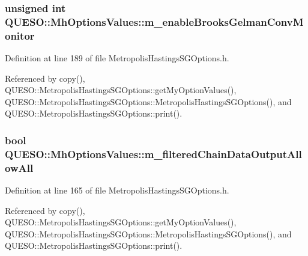 \hypertarget{class_q_u_e_s_o_1_1_mh_options_values_afae1b3bf96ee3657212fa91ac7859bb7}{
\subsubsection[{m\-\_\-enable\-Brooks\-Gelman\-Conv\-Monitor}]{\setlength{\rightskip}{0pt plus 5cm}unsigned int Q\-U\-E\-S\-O\-::\-Mh\-Options\-Values\-::m\-\_\-enable\-Brooks\-Gelman\-Conv\-Monitor}}\label{class_q_u_e_s_o_1_1_mh_options_values_afae1b3bf96ee3657212fa91ac7859bb7}


Definition at line 189 of file Metropolis\-Hastings\-S\-G\-Options.\-h.



Referenced by copy(), Q\-U\-E\-S\-O\-::\-Metropolis\-Hastings\-S\-G\-Options\-::get\-My\-Option\-Values(), Q\-U\-E\-S\-O\-::\-Metropolis\-Hastings\-S\-G\-Options\-::\-Metropolis\-Hastings\-S\-G\-Options(), and Q\-U\-E\-S\-O\-::\-Metropolis\-Hastings\-S\-G\-Options\-::print().

\hypertarget{class_q_u_e_s_o_1_1_mh_options_values_a249e8720b4570d5f4e6504a29a84ac04}{
\subsubsection[{m\-\_\-filtered\-Chain\-Data\-Output\-Allow\-All}]{\setlength{\rightskip}{0pt plus 5cm}bool Q\-U\-E\-S\-O\-::\-Mh\-Options\-Values\-::m\-\_\-filtered\-Chain\-Data\-Output\-Allow\-All}}\label{class_q_u_e_s_o_1_1_mh_options_values_a249e8720b4570d5f4e6504a29a84ac04}


Definition at line 165 of file Metropolis\-Hastings\-S\-G\-Options.\-h.



Referenced by copy(), Q\-U\-E\-S\-O\-::\-Metropolis\-Hastings\-S\-G\-Options\-::get\-My\-Option\-Values(), Q\-U\-E\-S\-O\-::\-Metropolis\-Hastings\-S\-G\-Options\-::\-Metropolis\-Hastings\-S\-G\-Options(), and Q\-U\-E\-S\-O\-::\-Metropolis\-Hastings\-S\-G\-Options\-::print().

